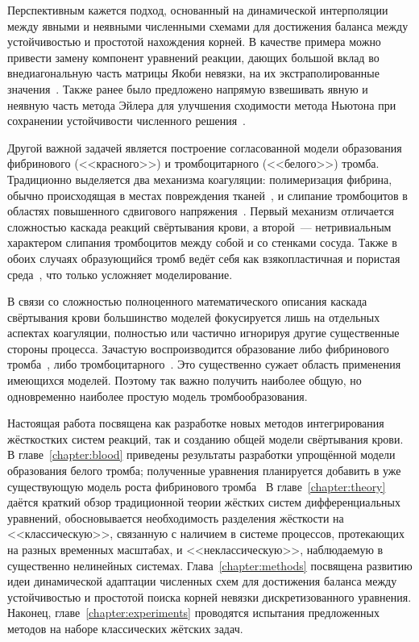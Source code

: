 Перспективным кажется подход, основанный на динамической интерполяции между явными и неявными численными схемами
для достижения баланса между устойчивостью и простотой нахождения корней.
В качестве примера можно привести замену компонент уравнений реакции,
дающих большой вклад во внедиагональную часть матрицы Якоби невязки,
на их экстраполированные значения~\cite{vassilevski2020parallel}.
Также ранее было предложено напрямую взвешивать явную и неявную часть метода Эйлера для
улучшения сходимости метода Ньютона при сохранении устойчивости численного решения~\cite{butakov2022two_methods}.

Другой важной задачей является построение согласованной модели образования фибринового (<<красного>>)
и тромбоцитарного (<<белого>>) тромба.
Традиционно выделяется два механизма коагуляции:
полимеризация фибрина, обычно происходящая в местах повреждения тканей~\cite{rasche2001haemostasis_overview, panteleev2008coagulation, ushakova2018gemo},
и слипание тромбоцитов в областях повышенного сдвигового напряжения~\cite{rahman2019platelet_adhesion, savage1996platelet_adhesion, avtaeva2022vWF}.
Первый механизм отличается сложностью каскада реакций свёртывания крови,
а второй~--- нетривиальным характером слипания тромбоцитов между собой и со стенками сосуда.
Также в обоих случаях образующийся тромб ведёт себя как взякопластичная и пористая среда~\cite{wufsus2013clot_permeability, jamiolkowski2016visualization},
что только усложняет моделирование.

В связи со сложностью полноценного математического описания каскада свёртывания крови
большинство моделей фокусируется лишь на отдельных аспектах коагуляции,
полностью или частично игнорируя другие существенные стороны процесса.
Зачастую воспроизводится образование либо фибринового тромба~\cite{bouchnita2020mathematical, vassilevski2020parallel},
либо тромбоцитарного~\cite{sorensen1999platelets_deposition_model, goodman2005thrombosis_model, taylor2016thrombosis_model, wu2017deposition_model}.
Это существенно сужает область применения имеющихся моделей.
Поэтому так важно получить наиболее общую,
но одновременно наиболее простую модель тромбообразования.

Настоящая работа посвящена как разработке новых методов интегрирования жёсткостких систем реакций,
так и созданию общей модели свёртывания крови.
В главе~\ref{chapter:blood} приведены результаты разработки упрощённой модели образования белого тромба;
полученные уравнения планируется добавить в уже существующую модель роста
фибринового тромба~\cite{bouchnita2020mathematical, vassilevski2020parallel}
В главе~\ref{chapter:theory} даётся краткий обзор традиционной теории жёстких систем дифференциальных уравнений,
обосновывается необходимость разделения жёсткости на <<классическую>>,
связанную с наличием в системе процессов, протекающих на разных временных масштабах,
и <<неклассическую>>, наблюдаемую в существенно нелинейных системах.
Глава~\ref{chapter:methods} посвящена развитию идеи динамической адаптации численных схем
для достижения баланса между устойчивостью и простотой поиска корней невязки дискретизованного уравнения.
Наконец, главе~\ref{chapter:experiments} проводятся испытания предложенных методов на наборе классических жётских задач.
